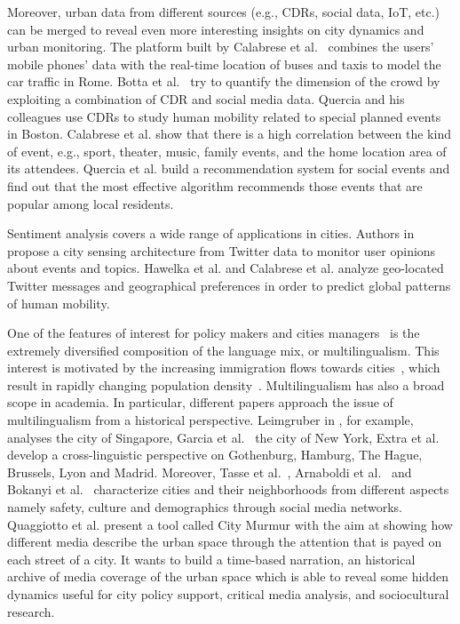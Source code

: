 Moreover, urban data from different sources (e.g., CDRs, social data, IoT, etc.) can be merged to reveal even more interesting insights on city dynamics and urban monitoring. 
The platform built by Calabrese et al.~\cite{calabrese2011real} combines the users' mobile phones' data with the real-time location of buses and taxis to model the car traffic in Rome. Botta et al.~\cite{botta2015quantifying} try to quantify the dimension of the crowd by exploiting a combination of CDR and social media data.
Quercia and his colleagues \cite{quercia2011mobile} use CDRs to study human mobility related to special planned events in Boston. Calabrese et al. \cite{calabrese2010geography} show that there is a high correlation between the kind of event, e.g., sport, theater, music, family events, and the home location area of its attendees. Quercia et al. \cite{quercia2010recommending} build a recommendation system for social events and find out that the most effective algorithm recommends those events that are popular among local residents.

Sentiment analysis covers a wide range of applications in cities. Authors in \cite{ahmed2016smart} propose a city sensing architecture from Twitter data to monitor user opinions about events and topics. Hawelka et al. \cite{hawelka2014geo} and Calabrese et al. \cite{calabrese2010human} analyze geo-located Twitter messages and geographical preferences in order to predict global patterns of human mobility.

One of the features of interest for policy makers and cities managers~\cite{habitat2016urbanization} is the extremely diversified composition of the language mix, or multilingualism. This interest is motivated by the increasing immigration flows towards cities~\cite{sanderson2015world}, which result in rapidly changing population density~\cite{deville2014dynamic}. Multilingualism has also a broad scope in academia. In particular, different papers approach the issue of multilingualism from a historical perspective. Leimgruber in \cite{leimgruber2013management}, for example, analyses the city of Singapore, Garcia et al.~\cite{garcia2001multilingual} the city of New York, Extra et al.~\cite{extra2004urban} develop a cross-linguistic perspective on Gothenburg, Hamburg, The Hague, Brussels, Lyon and Madrid.
Moreover, Tasse et al.~\cite{tasse2016generating}, Arnaboldi et al.~\cite{arnaboldi2016studying} and Bokanyi et al.~\cite{bokanyi2015race} characterize cities and their neighborhoods from different aspects namely safety, culture and demographics through social media networks. Quaggiotto et al. \cite{quaggiotto2010new} present a tool called City Murmur with the aim at showing how different media describe the urban space through the attention that is payed on each street of a city. It wants to build a time-based narration, an historical archive of media coverage of the urban space which is able to reveal some hidden dynamics useful for city policy support, critical media analysis, and sociocultural research.

